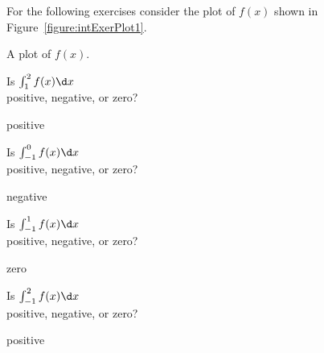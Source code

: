 \begin{exercises}

\noindent For the following exercises consider the plot of $f(x)$
shown in Figure~\ref{figure:intExerPlot1}.
\begin{marginfigure}
\caption{A plot of $f(x)$.}
\label{figure:intExerPlot1}
\end{marginfigure}
\twocol
\begin{exercise}
Is $\int_1^2 f(x) \d x$ \\
positive, negative, or zero?
\begin{answer}
positive
\end{answer}
\end{exercise}

\begin{exercise}
Is $\int_{-1}^0 f(x) \d x$ \\
positive, negative, or zero?
\begin{answer}
negative
\end{answer}
\end{exercise}

\begin{exercise}
Is $\int_{-1}^1 f(x) \d x$ \\
positive, negative, or zero?
\begin{answer}
zero
\end{answer}
\end{exercise}

\begin{exercise}
Is $\int_{-1}^2 f(x) \d x$ \\
positive, negative, or zero?
\begin{answer}
positive
\end{answer}
\end{exercise}

\endtwocol


\end{exercises}
